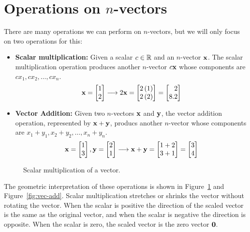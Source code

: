 \section{Operations on $n$-vectors}
There are many operations we can perform on $n$-vectors, but we will only focus on two operations for this:
\begin{itemize}
    \item \textbf{Scalar multiplication:} Given a scalar $c \in \mathbb{R}$ and an $n$-vector $\mathbf{x}$. The scalar multiplication operation produces another $n$-vector $c\mathbf{x}$ whose components are $cx_1, cx_2, \ldots, cx_n$. 
    \[ \mf{x} = \bmx 1 \\ 2\emx \longrightarrow 2 \mf{x} = \bmx  2\ct{1} \\ 2\ct{2} \emx = \bmx  2 \\ 8.2 \emx \]
    
    \item \textbf{Vector Addition:} Given two $n$-vectors $\mathbf{x}$ and $\mathbf{y}$, the vector addition operation, represented by $\mathbf{x} + \mathbf{y}$, producs another $n$-vector whose components are $x_1 + y_1, x_2 + y_2, \ldots, x_n + y_n$.
    \[ \mf{x} = \bmxc 1 \\ 3 \emx, \mf{y} = \bmxc 2 \\ 1 \emx \longrightarrow \mf{x} + \mf{y} = \bmxc 1 + 2 \\ 3 + 1 \emx = \bmxc 3 \\ 4 \emx \]
\end{itemize}
\begin{figure}[h]
    \centering
    \caption{Scalar multiplication of a vector.}
    \label{fig:scalar-mult}
\end{figure}

The geometric interpretation of these operations is shown in Figure~\ref{fig:scalar-mult} and Figure~\ref{fig:vec-add}. Scalar multiplication stretches or shrinks the vector without rotating the vector. When the scalar is positive the direction of the scaled vector is the same as the original vector, and when the scalar is negative the direction is opposite. When the scalar is zero, the scaled vector is the zero vector $\mathbf{0}$. 

